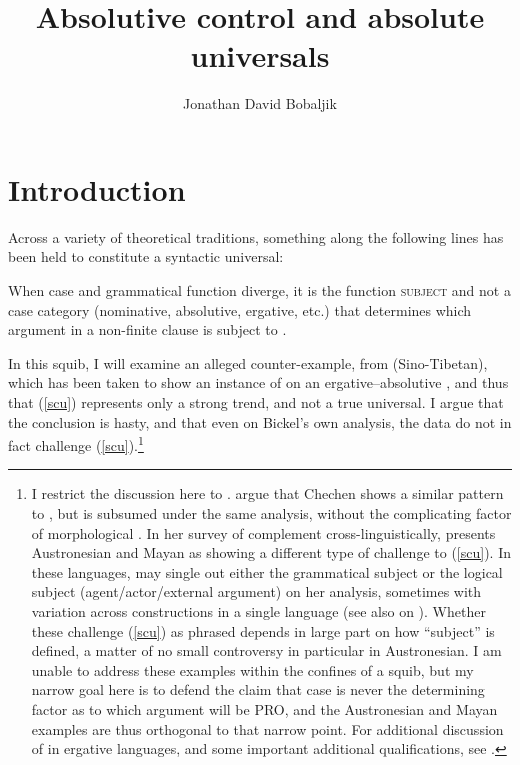 \documentclass[output=paper]{langsci/langscibook}
\author{Jonathan David Bobaljik\affiliation{Harvard University}}
\title{Absolutive control and absolute universals}
\begin{document}
\glsresetall
\maketitle

\section{Introduction}

Across a variety of theoretical traditions, something along the following lines
has been held to constitute a syntactic universal:

\ea \label{scu} When case and grammatical function diverge, it is the function
\textsc{subject} and not a case category (nominative, absolutive, ergative, etc.)
that determines which argument in a non-finite clause is subject to .
\z

In this squib, I will examine an alleged counter-example, from 
(Sino-Tibetan), which has been taken \citep{bicknich01,malchukov14} to show an
instance of  on an ergative--absolutive , and thus that
(\ref{scu}) represents only a strong trend, and not a true universal. I argue
that the conclusion is hasty, and that even on Bickel's own analysis, the data
do not in fact challenge (\ref{scu}).\footnote{I restrict the discussion here
    to . \citet{bicknich01} argue that Chechen shows a similar pattern
    to , but is subsumed under the same analysis, without the
    complicating factor of morphological . In her survey of complement
     cross-linguistically, \cite{stiebels07} presents Austronesian and
    Mayan as showing a different type of challenge to (\ref{scu}).  In these
    languages,  may single out either the grammatical subject or the
    logical subject (agent/actor/external argument) on her analysis,  sometimes
    with variation across constructions in a single language (see also
    \citealp{Kroeger:1993,wurmbrand13tag} on ).  Whether these challenge
    (\ref{scu}) as phrased depends in large part on how \enquote{subject} is
    defined, a matter of no small controversy in particular in Austronesian. I
    am unable to address these examples within the confines of a squib, but my
    narrow goal here is to defend the claim that case is never the determining
    factor as to which argument will be PRO, and the Austronesian and Mayan
    examples are thus orthogonal to that narrow point. For additional
discussion of  in ergative languages, and some important additional
qualifications, see \citet[104--109]{polinsky16}.}
\end{document}
